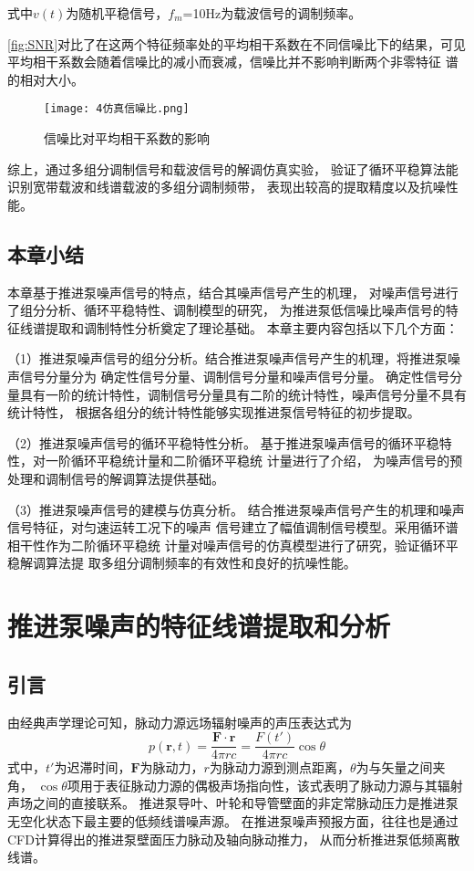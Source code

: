 式中$v\left ( t \right )$为随机平稳信号，$f_m$=10Hz为载波信号的调制频率。

\autoref{fig:SNR}对比了在这两个特征频率处的平均相干系数在不同信噪比下的结果，可见
平均相干系数会随着信噪比的减小而衰减，信噪比并不影响判断两个非零特征
谱的相对大小。

\begin{figure}[htbp]
    \centering
    \texttt{[image: 4仿真信噪比.png]}
    \caption{\label{fig:SNR}信噪比对平均相干系数的影响
    }
\end{figure}

综上，通过多组分调制信号和载波信号的解调仿真实验，
验证了循环平稳算法能识别宽带载波和线谱载波的多组分调制频带，
表现出较高的提取精度以及抗噪性能。
\section{本章小结}
本章基于推进泵噪声信号的特点，结合其噪声信号产生的机理，
对噪声信号进行了组分分析、循环平稳特性、调制模型的研究，
为推进泵低信噪比噪声信号的特征线谱提取和调制特性分析奠定了理论基础。
本章主要内容包括以下几个方面：

（1）推进泵噪声信号的组分分析。结合推进泵噪声信号产生的机理，将推进泵噪声信号分量分为
确定性信号分量、调制信号分量和噪声信号分量。
确定性信号分量具有一阶的统计特性，调制信号分量具有二阶的统计特性，噪声信号分量不具有统计特性，
根据各组分的统计特性能够实现推进泵信号特征的初步提取。 

（2）推进泵噪声信号的循环平稳特性分析。
基于推进泵噪声信号的循环平稳特性，对一阶循环平稳统计量和二阶循环平稳统
计量进行了介绍，
为噪声信号的预处理和调制信号的解调算法提供基础。

（3）推进泵噪声信号的建模与仿真分析。
结合推进泵噪声信号产生的机理和噪声信号特征，对匀速运转工况下的噪声
信号建立了幅值调制信号模型。采用循环谱相干性作为二阶循环平稳统
计量对噪声信号的仿真模型进行了研究，验证循环平稳解调算法提
取多组分调制频率的有效性和良好的抗噪性能。


\chapter{推进泵噪声的特征线谱提取和分析}
\section{引言}
由经典声学理论可知，脉动力源远场辐射噪声的声压表达式为
\begin{equation}
    \label{equ:p}
    p\left ( \mathbf{r} ,t \right ) =\frac{\mathbf{F}\cdot \mathbf{r} }{4\pi rc} =\frac{F\left ( t' \right ) }{4\pi rc}\cos \theta  
\end{equation}
式中，$t'$为迟滞时间，$\mathbf{F}$为脉动力，$r$为脉动力源到测点距离，$\theta$为与矢量之间夹角，
$\cos \theta$项用于表征脉动力源的偶极声场指向性，该式表明了脉动力源与其辐射声场之间的直接联系\cite{__2016杨琼方}。
推进泵导叶、叶轮和导管壁面的非定常脉动压力是推进泵无空化状态下最主要的低频线谱噪声源。
在推进泵噪声预报方面，往往也是通过CFD计算得出的推进泵壁面压力脉动及轴向脉动推力，
从而分析推进泵低频离散线谱。

